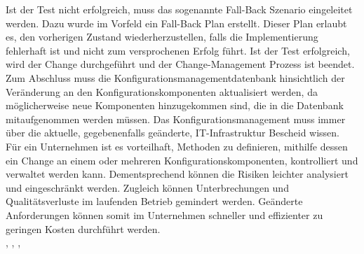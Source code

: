 Ist der Test nicht erfolgreich, muss das sogenannte Fall-Back Szenario eingeleitet werden. Dazu wurde im Vorfeld ein Fall-Back Plan erstellt. Dieser Plan erlaubt es, den vorherigen Zustand wiederherzustellen, falls die Implementierung fehlerhaft ist und nicht zum versprochenen Erfolg führt. Ist der Test erfolgreich, wird der Change durchgeführt und der Change-Management Prozess ist beendet.
\\
Zum Abschluss muss die Konfigurationsmanagementdatenbank hinsichtlich der Veränderung an den Konfigurationskomponenten aktualisiert werden, da möglicherweise neue Komponenten hinzugekommen sind, die in die Datenbank mitaufgenommen werden müssen. Das Konfigurationsmanagement muss immer über die aktuelle, gegebenenfalls geänderte, IT-Infrastruktur Bescheid wissen.
\\
Für ein Unternehmen ist es vorteilhaft, Methoden zu definieren, mithilfe dessen ein Change an einem oder mehreren Konfigurationskomponenten, kontrolliert und verwaltet werden kann. Dementsprechend können die Risiken leichter analysiert und eingeschränkt werden. Zugleich können Unterbrechungen und Qualitätsverluste im laufenden Betrieb gemindert werden. Geänderte Anforderungen können somit im Unternehmen schneller und effizienter zu geringen Kosten durchführt werden. 
\\
\cite{cm-oldenburg}, \cite{cm-stolpersteine}, \cite{cm-itil} \cite{cm-bestpractices}, \cite{cm-munich}